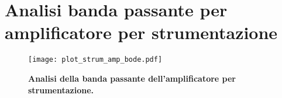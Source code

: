 \documentclass[
    rmp,
    reprint, 
    superscriptaddress, 
    altaffilletter, 
    amsmath, 
    amssymb,
    a4paper]{revtex4-2}
\begin{document}
\section{Analisi banda passante per amplificatore per strumentazione}

\renewcommand{\thetable}{C-\arabic{table}}
\renewcommand{\thefigure}{C-\arabic{figure}}

\begin{figure}[!h]
    \raggedright
    \texttt{[image: plot\_strum\_amp\_bode.pdf]}
    \caption{\textbf{Analisi della banda passante dell'amplificatore per strumentazione.}}
    \label{fig:gbw_amp_strum}
\end{figure}
\end{document}
